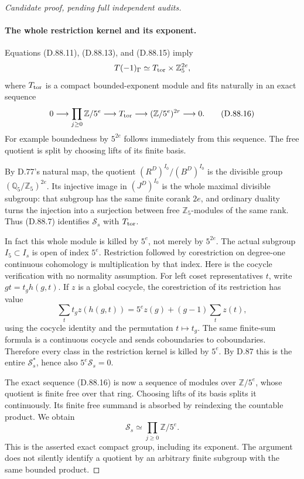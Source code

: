 \begin{proof}[Candidate proof, pending full independent audits]
\paragraph{The whole restriction kernel and its exponent.}
Equations (D.88.11), (D.88.13), and (D.88.15) imply
\[
 T(-1)_\Gamma\simeq T_{\rm tor}\times\mathbb Z_5^{2e},
\]
where \(T_{\rm tor}\) is a compact bounded-exponent module
and fits naturally in an exact sequence
\[
 0\longrightarrow\prod_{j\ge0}\mathbb Z/5^e
    \longrightarrow T_{\rm tor}
    \longrightarrow(\mathbb Z/5^e)^{2r}\longrightarrow0.
                                                               \tag{D.88.16}
\]
For example boundedness by \(5^{2e}\) follows immediately
from this sequence. The free quotient is split by choosing
lifts of its finite basis.

By D.77's natural map, the quotient
\((R^D)^{I_0}/(B^D)^{I_0}\) is the divisible group
\((\mathbb Q_5/\mathbb Z_5)^{2e}\). Its injective image
in \((J^D)^{I_0}\) is the whole maximal divisible subgroup:
that subgroup has the same finite corank \(2e\), and
ordinary duality turns the injection into a surjection between
free \(\mathbb Z_5\)-modules of the same rank. Thus
(D.88.7) identifies \(\mathcal S_s\) with \(T_{\rm tor}\).

In fact this whole module is killed by \(5^e\), not merely
by \(5^{2e}\). The actual subgroup \(I_5\subset I_s\)
is open of index \(5^e\). Restriction followed by
corestriction on degree-one continuous cohomology is
multiplication by that index.\cite[II, Proposition 1.30]{PBC_MilneCFT}
Here is the cocycle verification
with no normality assumption. For left coset representatives
\(t\), write \(gt=t_g h(g,t)\). If \(z\) is a global
cocycle, the corestriction of its restriction has value
\[
 \sum_t t_g z(h(g,t))
   =5^e z(g)+(g-1)\sum_t z(t),
                                                               \tag{D.88.17}
\]
using the cocycle identity and the permutation \(t\mapsto t_g\).
The same finite-sum formula is a continuous cocycle and sends
coboundaries to coboundaries. Therefore every class in the
restriction kernel is killed by \(5^e\). By D.87 this is
the entire \(\mathcal S_s^*\), hence also
\(5^e\mathcal S_s=0\).

The exact sequence (D.88.16) is now a sequence of modules over
\(\mathbb Z/5^e\), whose quotient is finite free over that
ring. Choosing lifts of its basis splits it continuously.
Its finite free summand is absorbed by reindexing the countable
product. We obtain
\[
                       \mathcal S_s\simeq
                            \prod_{j\ge0}\mathbb Z/5^e.
\]
This is the asserted exact compact group, including its exponent.
The argument does not silently identify a quotient by an
arbitrary finite subgroup with the same bounded product.


\end{proof}
